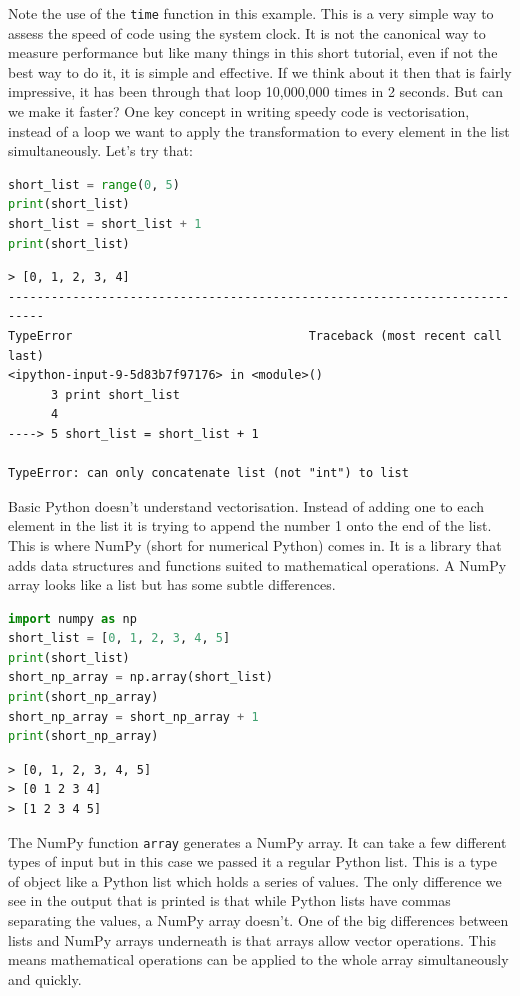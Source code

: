 	Note the use of the \texttt{time} function in this example. This is a very simple way to assess the speed of code using the system clock. It is not the canonical way to measure performance but like many things in this short tutorial, even if not the best way to do it, it is simple and effective.
	If we think about it then that is fairly impressive, it has been through that loop 10,000,000 times in 2 seconds. But can we make it faster? One key concept in writing speedy code is vectorisation, instead of a loop we want to apply the transformation to every element in the list simultaneously. Let's try that:

	\begin{lstlisting}[language=Python]
short_list = range(0, 5)
print(short_list)
short_list = short_list + 1
print(short_list)\end{lstlisting}

	\begin{verbatim}
> [0, 1, 2, 3, 4]
---------------------------------------------------------------------------
TypeError                                 Traceback (most recent call last)
<ipython-input-9-5d83b7f97176> in <module>()
      3 print short_list
      4 
----> 5 short_list = short_list + 1

TypeError: can only concatenate list (not "int") to list\end{verbatim}

	Basic Python doesn't understand vectorisation. Instead of adding one to each element in the list it is trying to append the number 1 onto the end of the list. This is where NumPy (short for numerical Python) comes in. It is a library that adds data structures and functions suited to mathematical operations. A NumPy array looks like a list but has some subtle differences.

	\begin{lstlisting}[language=Python]
import numpy as np
short_list = [0, 1, 2, 3, 4, 5]
print(short_list)
short_np_array = np.array(short_list)
print(short_np_array)
short_np_array = short_np_array + 1
print(short_np_array)\end{lstlisting}

	\begin{verbatim}
> [0, 1, 2, 3, 4, 5]
> [0 1 2 3 4]
> [1 2 3 4 5]
	\end{verbatim}

	The NumPy function \texttt{array} generates a NumPy array. It can take a few different types of input but in this case we passed it a regular Python list. This is a type of object like a Python list which holds a series of values. The only difference we see in the output that is printed is that while Python lists have commas separating the values, a NumPy array doesn't. One of the big differences between lists and NumPy arrays underneath is that arrays allow vector operations. This means mathematical operations can be applied to the whole array simultaneously and quickly.

